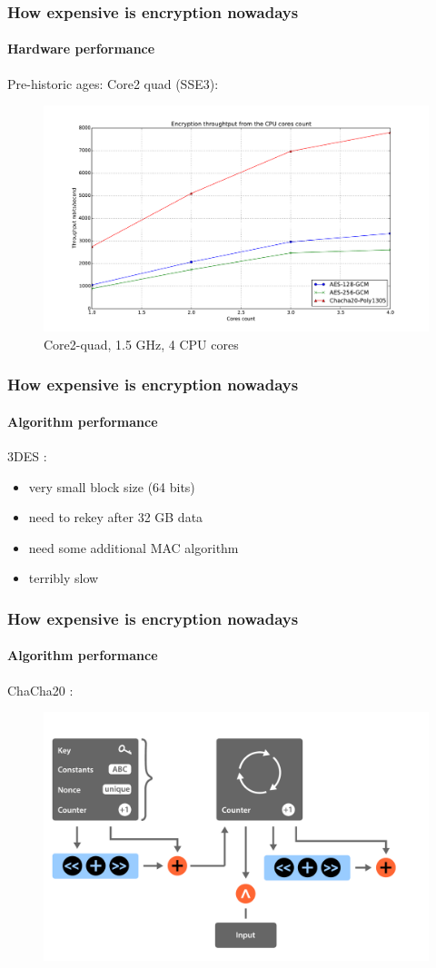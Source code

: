 \documentclass[11pt,t]{beamer}
\newcommand{\cipher}[1]{
	{\color{blue!30} #1}
}
\begin{document}
\begin{frame}
\frametitle{How expensive is encryption nowadays}
\framesubtitle{Hardware performance}
Pre-historic ages: Core2 quad (SSE3):
\begin{figure}[H]
\includegraphics[height=0.6\textheight]{perf-c2.pdf}
\caption{Core2-quad, 1.5 GHz, 4 CPU cores}
\end{figure}
\end{frame}

\begin{frame}
\frametitle{How expensive is encryption nowadays}
\framesubtitle{Algorithm performance} 
\cipher{3DES}:
	\begin{itemize}
	\item very small block size (64 bits)
	\item need to rekey after 32 GB data
	\item need some additional MAC algorithm
	\item terribly slow
	\end{itemize}
\end{frame}

\begin{frame}
\frametitle{How expensive is encryption nowadays}
\framesubtitle{Algorithm performance} 
\cipher{ChaCha20}:
\begin{figure}[H]
\includegraphics[height=0.7\textheight]{chacha.pdf}
\end{figure}
\end{frame}
\end{document}
